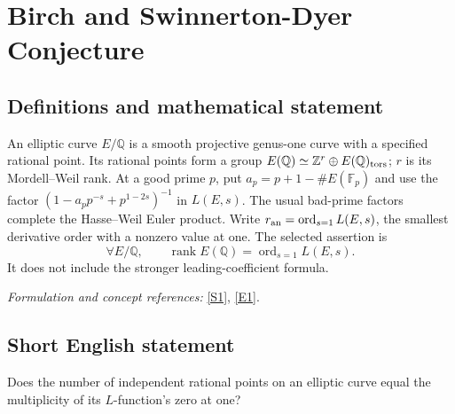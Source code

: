 \documentclass[11pt]{article}
\begin{document}
\section*{\texorpdfstring{Birch and Swinnerton-Dyer Conjecture}{Birch and Swinnerton-Dyer Conjecture}}\label{statement}
\subsection{Definitions and mathematical statement}
An elliptic curve $E/{\mathbb{Q}}$ is a smooth projective genus-one curve with a specified rational point. Its rational points form a group $E({\mathbb{Q}})\simeq{\mathbb{Z}}^r\oplus E({\mathbb{Q}})_{\rm tors}$; $r$ is its Mordell--Weil rank. At a good prime $p$, put $a_p=p+1-\#E({\mathbb{F}}_p)$ and use the factor $(1-a_pp^{-s}+p^{1-2s})^{-1}$ in $L(E,s)$. The usual bad-prime factors complete the Hasse--Weil Euler product. Write $r_{\rm an}=\operatorname{ord}_{s=1}L(E,s)$, the smallest derivative order with a nonzero value at one. The selected assertion is
\[
 \forall E/{\mathbb{Q}},\qquad \operatorname{rank}E({\mathbb{Q}})=\operatorname{ord}_{s=1}L(E,s).
\]
It does not include the stronger leading-coefficient formula.
\par\smallskip\textit{Formulation and concept references:} \href{https://www.claymath.org/library/monographs/MPPc.pdf}{[S1]}, \href{https://www.claymath.org/wp-content/uploads/2022/05/birchswin.pdf}{[E1]}.

\subsection{Short English statement}
Does the number of independent rational points on an elliptic curve equal the multiplicity of its $L$-function's zero at one?
\end{document}

